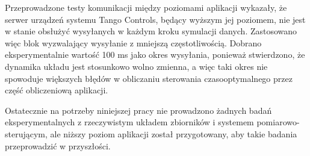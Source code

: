 Przeprowadzone testy komunikacji między poziomami aplikacji wykazały, że serwer urządzeń systemu Tango Controls, będący wyższym jej poziomem, nie jest w stanie obsłużyć wysyłanych w każdym kroku symulacji danych. Zastosowano więc blok wyzwalający wysyłanie z mniejszą częstotliwością. Dobrano eksperymentalnie wartość 100 ms jako okres wysyłania, ponieważ stwierdzono, że dynamika układu jest stosunkowo wolno zmienna, a więc taki okres nie spowoduje większych błędów w obliczaniu sterowania czasooptymalnego przez część obliczeniową aplikacji.

Ostatecznie na potrzeby niniejszej pracy nie prowadzono żadnych badań eksperymentalnych z rzeczywistym układem zbiorników i systemem pomiarowo-sterującym, ale niższy poziom aplikacji został przygotowany, aby takie badania przeprowadzić w przyszłości.